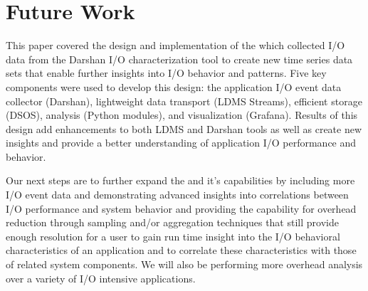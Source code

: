 \section{Future Work}
\label{sec:conclusion}
This paper covered the \Darshan{} design and implementation of the \connector{} which 
collected I/O data from the Darshan I/O characterization tool to create new time series data sets
that enable further insights into I/O behavior and patterns. Five key components were used 
to develop this design: the application I/O event data collector (Darshan), lightweight data 
transport (LDMS Streams), efficient storage (DSOS), analysis (Python modules), and 
visualization (Grafana). Results of this design add enhancements to both LDMS and Darshan 
tools as well as create new insights and provide a better understanding of application 
I/O performance and behavior. 

Our next steps are to further expand the \connector{} and it's capabilities by
including more I/O event data and demonstrating advanced insights into correlations 
between I/O performance and system behavior and providing the
capability for overhead reduction through sampling and/or aggregation techniques that still
provide enough resolution for a user to gain run time insight into the I/O behavioral
characteristics of an application and to correlate these characteristics with those of
related system components. We will also be performing more overhead analysis over a variety
of I/O intensive applications.




